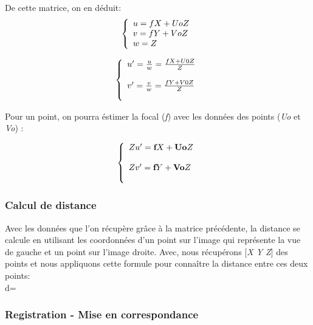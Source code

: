 \documentclass[12pt, french]{report}
\begin{document}
De cette matrice, on en déduit:\\
$$\left\{ 
    \begin{array}{l}
        u=fX+UoZ\\
        v=fY+VoZ\\
        w=Z\\
    \end{array} \\
\right. $$

$$\left\{ 
    \begin{array}{ll}
        u'=\frac{u}{w}=\frac{fX+U0Z}{Z}\\ \\
        v'=\frac{v}{w}=\frac{fY+V0Z}{Z} \\ \\
    \end{array} \\
\right. $$


Pour un point, on pourra éstimer la focal (\textit{f}) avec les données des points (\textit{Uo} et \textit{Vo}) :

$$\left\{ 
    \begin{array}{ll}
        Zu'=\textbf{f}X+\textbf{Uo}Z\\ \\
        Zv'=\textbf{f}Y+\textbf{Vo}Z \\ \\
    \end{array} \\
\right. $$

\subsubsection{Calcul de distance}

Avec les données que l'on récupère grâce à la matrice précédente, la distance se calcule en utilisant les coordonnées d'un point sur l'image qui représente la vue de gauche et un point sur l'image droite. Avec, nous récupérons  [\textit{X Y Z}] des points et nous appliquons cette formule pour connaître la distance entre ces deux points:\\

\hspace{4cm} d=

\subsubsection{Registration - Mise en correspondance}
\end{document}

